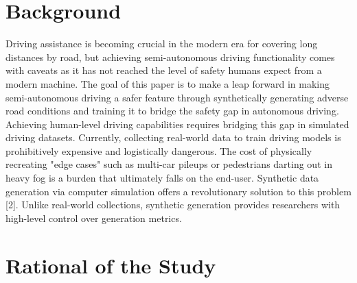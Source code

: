 \section{Background} 
Driving assistance is becoming crucial in the modern era for covering long distances by road, but achieving semi-autonomous driving functionality comes with caveats as it has not reached the level of safety humans expect from a modern machine. The goal of this paper is to make a leap forward in making semi-autonomous driving a safer feature through synthetically generating adverse road conditions and training it to bridge the safety gap in autonomous driving. Achieving human-level driving capabilities requires bridging this gap in simulated driving datasets. Currently, collecting real-world data to train driving models is prohibitively expensive and logistically dangerous. The cost of physically recreating "edge cases" such as multi-car pileups or pedestrians darting out in heavy fog is a burden that ultimately falls on the end-user. Synthetic data generation via computer simulation offers a revolutionary solution to this problem [2]. Unlike real-world collections, synthetic generation provides researchers with high-level control over generation metrics.
 \\


\section{Rational of the Study}

